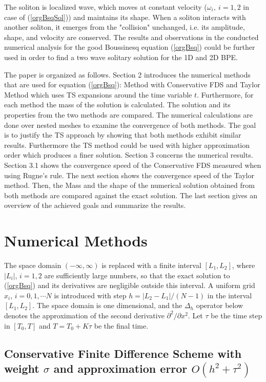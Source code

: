 \documentclass[%
 aip,
cp,  
 amsmath,amssymb,
 reprint,
]{iopconfser}
\newcommand{\rf}[1]{(\ref{#1})}
\begin{document}
The soliton is localized wave, which moves at constant velocity ($\omega_i, \: i=1,2$ in case of \rf{orgBsqSol}) and maintains its shape. When a soliton interacts with another soliton, it emerges from the "collision" unchanged, i.e. its amplitude, shape, and velocity are conserved. The results and observations in the conducted numerical analysis for the good Boussinesq equation \rf{orgBsq} could be further used in order to find a two wave solitary solution for the 1D and 2D BPE.

The paper is organized as follows. Section 2 introduces the numerical methods that are used for equation \rf{orgBsq}: Method with Conservative FDS and Taylor Method which uses TS expansions around the time variable $t$. Furthermore, for each method the mass of the solution is calculated. The solution and its properties from the two methods are compared. The numerical calculations are done over nested meshes to examine the convergence of both methods. The goal is to justify the TS approach by showing that both methods exhibit similar results. Furthermore the TS method could be used with higher approximation order which produces a finer solution. Section 3 concerns the numerical results. Section 3.1 shows the convergence speed of the Conservative FDS measured when using Rugne's rule. The next section shows the convergence speed of the Taylor method. Then, the Mass and the shape of the numerical solution obtained from both methods are compared against the exact solution. The last section gives an overview of the achieved goals and summarize the results.

\section{Numerical Methods}



The space domain $(-\infty,\infty)$ is replaced with a finite  interval $[L_1,L_2]$, where $|L_i|$, $i=1,2$ are sufficiently large numbers, so that the exact solution to \rf{orgBsq} and its derivatives are negligible outside this interval. A uniform grid $x_i$,  $i=0,1,\cdots N$ is introduced with step $h=|L_2-L_1|/(N-1)$ in the interval $[L_1,L_2]$. The space domain is one dimensional, and the $\Delta_h$ operator below denotes the approximation of the second derivative $\partial^2/\partial x^2$.
Let $\tau$ be the time step in $[T_0,T]$ and $T=T_0+K \tau$ be the final time. 

\subsection{ Conservative Finite Difference Scheme with weight $\sigma$ and approximation error $O(h^2+\tau^2)$}
\end{document}
